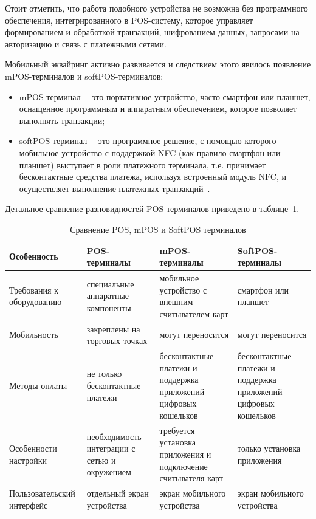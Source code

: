 Стоит отметить, что работа подобного устройства не возможна без программного обеспечения, интегрированного в POS-систему, которое управляет формированием и обработкой транзакций, шифрованием данных, запросами на авторизацию и связь с платежными сетями.

Мобильный эквайринг активно развивается и следствием этого явилось появление mPOS-терминалов и softPOS-терминалов:

\begin{itemize}
    \item mPOS-терминал~-- это портативное устройство, часто смартфон или планшет, оснащенное программным и аппаратным обеспечением, которое позволяет выполнять транзакции;
    \item softPOS терминал~-- это программное решение, с помощью которого мобильное устройство с поддержкой NFC (как правило смартфон или планшет) выступает в роли платежного терминала, т.е. принимает бесконтактные средства платежа, используя встроенный модуль NFC, и осуществляет выполнение платежных транзакций~\cite{pos_term}.
\end{itemize}

Детальное сравнение разновидностей POS-терминалов приведено в таблице~\ref{tab:pos_comparison}.

\begin{table}[H]
    \caption{Сравнение POS, mPOS и SoftPOS терминалов}
    \label{tab:pos_comparison}
    \begin{sloppypar}
        \centering
        \begin{tabularx}{\textwidth}{ | >{\raggedright\arraybackslash}X | >{\raggedright\arraybackslash}X | >{\raggedright\arraybackslash}X | >{\raggedright\arraybackslash}X | }
            \hline
            \textbf{Особенность} & \textbf{POS-терминалы} & \textbf{mPOS-терминалы} & \textbf{SoftPOS-терминалы} \\
            \hline
            Требования к оборудованию & специальные аппаратные компоненты & мобильное устройство с внешним считывателем карт & смартфон или планшет \\
            \hline
            Мобильность & закреплены на торговых точках & могут переносится & могут переносится \\
            \hline
            Методы оплаты & не только бесконтактные платежи & бесконтактные платежи и поддержка приложений цифровых кошельков & бесконтактные платежи и поддержка приложений цифровых кошельков \\
            \hline
            Особенности настройки & необходимость интеграции с сетью и окружением & требуется установка приложения и подключение считывателя карт & только установка приложения \\
            \hline
            Пользовательский интерфейс & отдельный экран устройства & экран мобильного устройства & экран мобильного устройства \\
            \hline
        \end{tabularx}
    \end{sloppypar}
\end{table}


